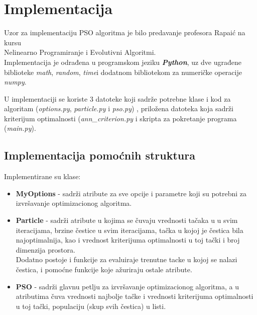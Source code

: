 \documentclass[12pt, a4paper]{article}
\begin{document}
    
    \section{Implementacija}
    Uzor za implementaciju PSO algoritma je bilo predavanje profesora Rapaić na kursu\\
    Nelinearno Programiranje i Evolutivni Algoritmi.\\
    
    Implementacija je odrađena u programskom jeziku \textit{\textbf{Python}}, uz dve ugrađene     biblioteke \textit{math}, \textit{random}, \textit{time}\space i dodatnom bibliotekom za numeričke
    operacije \textit{numpy}.
    
    U implementaciji se koriste 3 datoteke koji sadrže potrebne klase i    kod za algoritam (\textit{options.py}, \textit{particle.py} i \textit{pso.py}) , priložena
    datoteka koja sadrži kriterijum optimalnosti (\textit{ann\_criterion.py} i skripta za    pokretanje programa (\textit{main.py}).   \\
    
    \newpage
    
    \subsection{Implementacija pomoćnih struktura}
    
    \noindent Implementirane su klase:
        \begin{itemize}
            \item \textbf{MyOptions} - sadrži atribute za sve opcije i parametre koji su potrebni za izvršavanje optimizacionog algoritma.
            \item \textbf{Particle} - sadrži atribute u kojima se čuvaju vrednosti tačaka u u svim iteracijama, brzine čestice u svim iteracijama, tačka u kojoj je čestica bila najoptimalnija, kao i vrednost kriterijuma optimalnosti u toj tački i broj dimenzija prostora.\\
            Dodatno postoje i funkcije za evaluiraje trenutne tacke u kojoj se nalazi čestica, i pomoćne funkcije koje ažuriraju ostale atribute.
            \item \textbf{PSO} - sadrži glavnu petlju za izvršavanje optimizacionog algoritma, a u atributima čuva vrednosti najbolje tačke i vrednosti kriterijuma optimalnosti u toj tački, populaciju (skup svih čestica) u  listi.
        \end{itemize}
    
\end{document}
